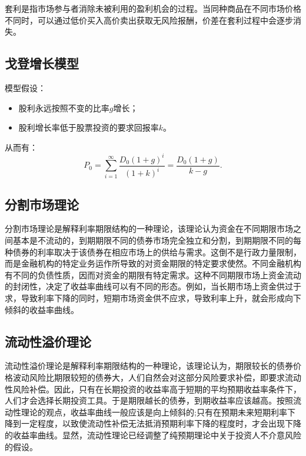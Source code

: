 \documentclass{article}
\begin{document}
套利是指市场参与者消除未被利用的盈利机会的过程。当同种商品在不同市场价格不同时，可以通过低价买入高价卖出获取无风险报酬，价差在套利过程中会逐步消失。

\subsection{戈登增长模型}

模型假设：
\begin{itemize}
	\item 股利永远按照不变的比率$g$增长；
	\item 股利增长率低于股票投资的要求回报率$k$。
\end{itemize}

从而有：
\begin{equation*}
  P_0 = \sum_{i=1}^{\infty}\frac{D_0(1+g)^i}{(1+k)^i} = \frac{D_0(1+g)}{k-g}.
\end{equation*}

\subsection{分割市场理论}

分割市场理论是解释利率期限结构的一种理论，该理论认为资金在不同期限市场之间基本是不流动的，到期期限不同的债券市场完全独立和分割，到期期限不同的每种债券的利率取决于该债券在相应市场上的供给与需求。这倒不是行政力量限制，而是金融机构的特定业务运作所导致的对资金期限的特定要求使然。不同金融机构有不同的负债性质，因而对资金的期限有特定需求。这种不同期限市场上资金流动的封闭性，决定了收益率曲线可以有不同的形态。例如，当长期市场上资金供过于求，导致利率下降的同时，短期市场资金供不应求，导致利率上升，就会形成向下倾斜的收益率曲线。

\subsection{流动性溢价理论}
流动性溢价理论是解释利率期限结构的一种理论，该理论认为，期限较长的债券价格波动风险比期限较短的债券大，人们自然会对这部分风险要求补偿，即要求流动性风险补偿。因此，只有在长期投资的收益率高于短期的平均预期收益率条件下，人们才会选择长期投资工具。于是期限越长的债券，到期收益率应该越高。按照流动性理论的观点，收益率曲线一般应该是向上倾斜的;只有在预期未来短期利率下降到一定程度，以致使流动性补偿无法抵消预期利率下降的程度时，才会出现下降的收益率曲线。显然，流动性理论已经调整了纯预期理论中关于投资人不介意风险的假设。
\end{document}
